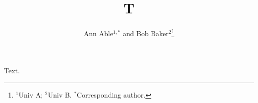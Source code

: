 \documentclass{article}
\begin{document}
\title{T}
\author{Ann Able$^{1,*}$ and Bob Baker$^{2}$\thanks{$^{1}$Univ A; $^{2}$Univ B. $^{*}$Corresponding author.}}
\maketitle
Text.
\end{document}

